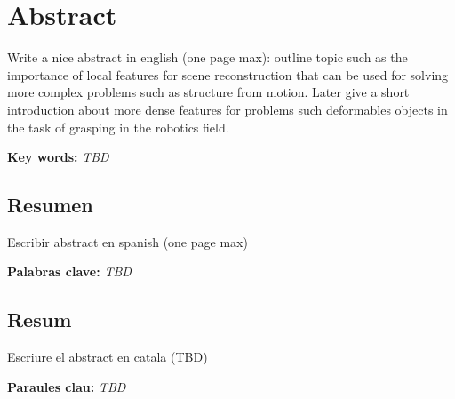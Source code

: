 


\chapter*{Abstract}

\vspace{-24mm}

Write a nice abstract in english (one page max):
outline topic such as the importance of local features for scene reconstruction that can be used for solving more complex problems such as structure from motion. Later give a short introduction about more dense features for problems such deformables objects in the task of grasping in the robotics field.

\vspace{1mm}
\textbf{Key words:} \textit{TBD}


\begin{otherlanguage}{spanish}
\chapter*{Resumen}

\vspace{-24mm}

Escribir abstract en spanish (one page max)

\vspace{1mm}
\textbf{Palabras clave:} \textit{TBD}



\end{otherlanguage}



\begin{otherlanguage}{catalan}
\cleardoublepage
\chapter*{Resum}
\vspace{-24mm}

Escriure el abstract en catala (TBD)

\vspace{1mm}
\textbf{Paraules clau:} \textit{TBD}


\end{otherlanguage}

